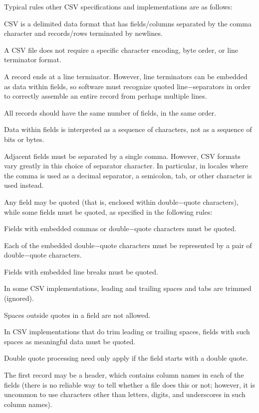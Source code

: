 Typical rules other CSV specifications and implementations are as follows:
\bit
\item CSV is a delimited data format that has fields/columns separated by the comma character and records/rows
terminated by newlines.
\item A CSV file does not require a specific character encoding, byte order, or line terminator format.
\item A record ends at a line terminator. However, line terminators can be embedded as data within fields, so software
must recognize quoted line$-$separators in order to correctly assemble an entire record from perhaps multiple lines.
\item All records should have the same number of fields, in the same order.
\item Data within fields is interpreted as a sequence of characters, not as a sequence of bits or bytes.
\item Adjacent fields must be separated by a single comma. However, CSV formats vary greatly in this choice of separator
character. In particular, in locales where the comma is used as a decimal separator, a semicolon, tab, or other
character is used instead.
\item Any field may be quoted (that is, enclosed within double$-$quote characters), while some fields must be quoted, as
specified in the following rules:
\bit
\item Fields with embedded commas or double$-$quote characters must be quoted.
\item Each of the embedded double$-$quote characters must be represented by a pair of double$-$quote characters.
\item Fields with embedded line breaks must be quoted.
\item In some CSV implementations, leading and trailing spaces and tabs are trimmed (ignored).
\item Spaces outside quotes in a field are not allowed.
\item In CSV implementations that do trim leading or trailing spaces, fields with such spaces as meaningful data must be
quoted.
\item Double quote processing need only apply if the field starts with a double quote.
\item The first record may be a header, which contains column names in each of the fields (there is no reliable way to
tell whether a file does this or not; however, it is uncommon to use characters other than letters, digits, and
underscores in such column names).
\eit
\eit


